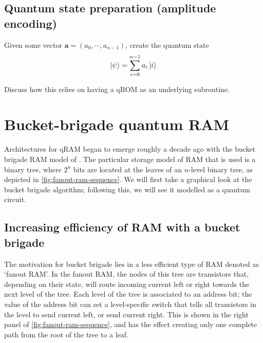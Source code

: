 \documentclass[a4paper,12pt]{article}
\begin{document}
\subsection{Quantum state preparation (amplitude encoding)}

Given some vector $\mathbf{a} = \left( a_0, \cdots,  a_{n-1} \right)$, create the quantum state
\begin{equation}
 \ket{\psi} = \sum_{i=0}^{n-1} a_i \ket{i}
\end{equation}

Discuss how this relies on having a qROM as an underlying subroutine.




\section{Bucket-brigade quantum RAM}
\label{sec:bb}

Architectures for qRAM began to emerge roughly a decade ago with the bucket brigade RAM model of \cite{Giovannetti2008, Giovannetti2008b}. 
The particular storage model of RAM that is used is a binary tree, where $2^n$ bits are located at the leaves of an $n$-level binary tree, as depicted in \autoref{fig:fanout-ram-sequence}. 
We will first take a graphical look at the bucket brigade algorithm; following this, we will see it modelled as a quantum circuit.

\subsection{Increasing efficiency of RAM with a bucket brigade}

The motivation for bucket brigade lies in a less efficient type of RAM denoted as `fanout RAM'. 
In the fanout RAM, the nodes of this tree are transistors that, depending on their state, will route incoming current left or right towards the next level of the tree. 
Each level of the tree is associated to an address bit; the value of the address bit can set a level-specific switch that tells all transistors in the level to send current left, or send current right. 
This is shown in the right panel of \autoref{fig:fanout-ram-sequence}, and has the effect creating only one complete path from the root of the tree to a leaf.
\end{document}
